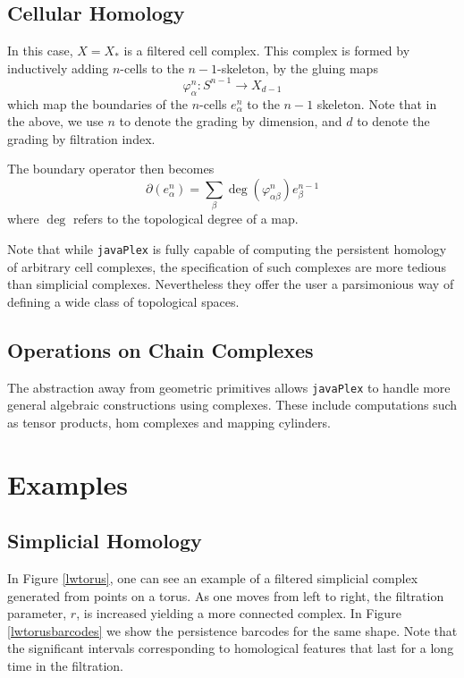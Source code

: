 \documentclass{gts2012}
\newcommand\javaPlex{\texttt{javaPlex}\xspace}
\begin{document}
\subsection{Cellular Homology}

In this case, $X = X_*$ is a filtered cell complex. This complex is formed by inductively adding $n$-cells to the $n-1$-skeleton, by the gluing maps 
$$\varphi_{\alpha}^n: S^{n-1} \rightarrow X_{d-1}$$
which map the boundaries of the $n$-cells $e_{\alpha}^n$ to the $n-1$ skeleton. Note that in the above, we use $n$ to denote the grading by dimension, and $d$ to denote the grading by filtration index.

The boundary operator then becomes 
$$\partial(e_{\alpha}^n) = \sum_{\beta} \deg(\varphi_{\alpha \beta}^n) e_{\beta}^{n-1}$$
where $\deg$ refers to the topological degree of a map.

Note that while \javaPlex is fully capable of computing the persistent homology of arbitrary cell complexes, the specification of such complexes are more tedious than simplicial complexes. Nevertheless they offer the user a parsimonious way of defining a wide class of topological spaces.

\subsection{Operations on Chain Complexes}

The abstraction away from geometric primitives allows \javaPlex to handle more general algebraic constructions using complexes. These include computations such as tensor products, hom complexes and mapping cylinders.

\section{Examples}

\subsection{Simplicial Homology}

In Figure \ref{lwtorus}, one can see an example of a filtered simplicial complex generated from points on a torus. As one moves from left to right, the filtration parameter, $r$, is increased yielding a more connected complex. In Figure \ref{lwtorusbarcodes} we show the persistence barcodes for the same shape. Note that the significant intervals corresponding to homological features that last for a long time in the filtration.
\end{document}
